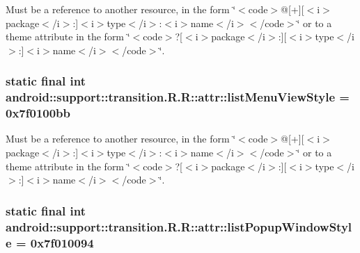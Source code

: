 Must be a reference to another resource, in the form \char`\"{}$<$code$>$@\mbox{[}+\mbox{]}\mbox{[}$<$i$>$package$<$/i$>$:\mbox{]}$<$i$>$type$<$/i$>$:$<$i$>$name$<$/i$>$$<$/code$>$\char`\"{} or to a theme attribute in the form \char`\"{}$<$code$>$?\mbox{[}$<$i$>$package$<$/i$>$:\mbox{]}\mbox{[}$<$i$>$type$<$/i$>$:\mbox{]}$<$i$>$name$<$/i$>$$<$/code$>$\char`\"{}. \hypertarget{classandroid_1_1support_1_1transition_1_1_r_1_1attr_e93ad32fd28d06fe3dc477c132ace815}{
\subsubsection[{listMenuViewStyle}]{\setlength{\rightskip}{0pt plus 5cm}static final int android::support::transition.R.R::attr::listMenuViewStyle = 0x7f0100bb}}
\label{classandroid_1_1support_1_1transition_1_1_r_1_1attr_e93ad32fd28d06fe3dc477c132ace815}


Must be a reference to another resource, in the form \char`\"{}$<$code$>$@\mbox{[}+\mbox{]}\mbox{[}$<$i$>$package$<$/i$>$:\mbox{]}$<$i$>$type$<$/i$>$:$<$i$>$name$<$/i$>$$<$/code$>$\char`\"{} or to a theme attribute in the form \char`\"{}$<$code$>$?\mbox{[}$<$i$>$package$<$/i$>$:\mbox{]}\mbox{[}$<$i$>$type$<$/i$>$:\mbox{]}$<$i$>$name$<$/i$>$$<$/code$>$\char`\"{}. \hypertarget{classandroid_1_1support_1_1transition_1_1_r_1_1attr_ae82c5ef152ac3e992cbb93053fe5ce5}{
\subsubsection[{listPopupWindowStyle}]{\setlength{\rightskip}{0pt plus 5cm}static final int android::support::transition.R.R::attr::listPopupWindowStyle = 0x7f010094}}
\label{classandroid_1_1support_1_1transition_1_1_r_1_1attr_ae82c5ef152ac3e992cbb93053fe5ce5}


